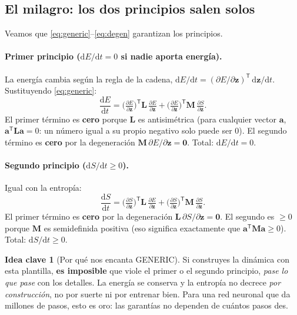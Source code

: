 \documentclass[11pt]{article}
\newcommand{\dd}{\mathrm{d}}
\theoremstyle{definition}
\newtheorem{idea}{Idea clave}[section]
\theoremstyle{plain}
\begin{document}
\subsection{El milagro: los dos principios salen solos}

Veamos que \eqref{eq:generic}--\eqref{eq:degen} garantizan los principios.

\paragraph{Primer principio ($\dd E/\dd t = 0$ si nadie aporta energía).} La
energía cambia según la regla de la cadena, $\dd E/\dd t = (\partial
E/\partial\bm z)^{\mathsf T}\,\dd\bm z/\dd t$. Sustituyendo \eqref{eq:generic}:
\begin{equation}
  \frac{\dd E}{\dd t}
  = \Big(\tfrac{\partial E}{\partial\bm z}\Big)^{\!\mathsf T}\bm L\,
    \tfrac{\partial E}{\partial\bm z}
  + \Big(\tfrac{\partial E}{\partial\bm z}\Big)^{\!\mathsf T}\bm M\,
    \tfrac{\partial S}{\partial\bm z}.
\end{equation}
El primer término es \textbf{cero} porque $\bm L$ es antisimétrica (para cualquier
vector $\bm a$, $\bm a^{\mathsf T}\bm L\bm a=0$: un número igual a su propio
negativo solo puede ser $0$). El segundo término es \textbf{cero} por la
degeneración $\bm M\,\partial E/\partial\bm z=\bm 0$. Total: $\dd E/\dd t=0$.

\paragraph{Segundo principio ($\dd S/\dd t \ge 0$).} Igual con la entropía:
\begin{equation}
  \frac{\dd S}{\dd t}
  = \Big(\tfrac{\partial S}{\partial\bm z}\Big)^{\!\mathsf T}\bm L\,
    \tfrac{\partial E}{\partial\bm z}
  + \Big(\tfrac{\partial S}{\partial\bm z}\Big)^{\!\mathsf T}\bm M\,
    \tfrac{\partial S}{\partial\bm z}.
\end{equation}
El primer término es \textbf{cero} por la degeneración $\bm L\,\partial
S/\partial\bm z=\bm 0$. El segundo es \textbf{$\ge 0$} porque $\bm M$ es
semidefinida positiva (eso significa exactamente que $\bm a^{\mathsf T}\bm M\bm
a\ge0$). Total: $\dd S/\dd t\ge0$.

\begin{idea}[Por qué nos encanta GENERIC]
Si construyes la dinámica con esta plantilla, \textbf{es imposible} que viole el
primer o el segundo principio, \emph{pase lo que pase} con los detalles. La energía
se conserva y la entropía no decrece \emph{por construcción}, no por suerte ni por
entrenar bien. Para una red neuronal que da millones de pasos, esto es oro: las
garantías no dependen de cuántos pasos des.
\end{idea}
\end{document}
